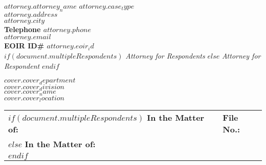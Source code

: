 \documentclass[12pt]{letter}
\date{}
\begin{document}
\begin{letter}{}
  \begin{flushleft}
    \textbf{$attorney.attorney_name$} \hfill \textbf{$attorney.case_type$} \\
    \textbf{$attorney.address$} \\
    \textbf{$attorney.city$} \\
    \textbf{Telephone $attorney.phone$} \\
    \textbf{$attorney.email$} \\
    \textbf{EOIR ID\# $attorney.eoir_id$} \\ 
    $if(document.multipleRespondents)$
      \textit{Attorney for Respondents}
    $else$
      \textit{Attorney for Respondent}
    $endif$ 

  \end{flushleft}
  
  \vspace{2em}
  
  \begin{center}
    \textbf{$cover.cover_department$} \\
    \textbf{$cover.cover_division$} \\
    \textbf{$cover.cover_name$} \\
    \textbf{$cover.cover_location$}
  \end{center}
  
  \vspace{2em}
   
\makebox[0.5\textwidth]{\hrulefill}
\begin{flushleft}
    \begin{tabular}{ p{} | p{} }


      $if(document.multipleRespondents)$
        \textbf{In the Matter of:} & \textbf{\hspace{1em}File No.:} \\
      $else$
        \textbf{In the Matter of:} \\
      $endif$ 

      \vspace{.0em} & \\ 


\end{tabular}
\end{flushleft}
\end{letter}
\end{document}
